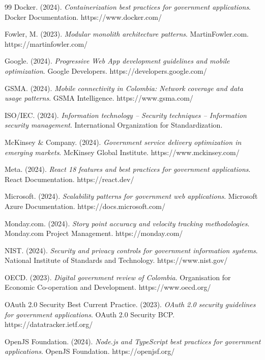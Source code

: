 \documentclass[12pt,a4paper]{article}
\begin{document}
\begin{thebibliography}{99}
 Docker. (2024). \emph{Containerization best practices for government applications}. Docker Documentation. https://www.docker.com/

 Fowler, M. (2023). \emph{Modular monolith architecture patterns}. MartinFowler.com. https://martinfowler.com/

 Google. (2024). \emph{Progressive Web App development guidelines and mobile optimization}. Google Developers. https://developers.google.com/

 GSMA. (2024). \emph{Mobile connectivity in Colombia: Network coverage and data usage patterns}. GSMA Intelligence. https://www.gsma.com/

 ISO/IEC. (2024). \emph{Information technology -- Security techniques -- Information security management}. International Organization for Standardization.

 McKinsey \& Company. (2024). \emph{Government service delivery optimization in emerging markets}. McKinsey Global Institute. https://www.mckinsey.com/

 Meta. (2024). \emph{React 18 features and best practices for government applications}. React Documentation. https://react.dev/

 Microsoft. (2024). \emph{Scalability patterns for government web applications}. Microsoft Azure Documentation. https://docs.microsoft.com/

 Monday.com. (2024). \emph{Story point accuracy and velocity tracking methodologies}. Monday.com Project Management. https://monday.com/

 NIST. (2024). \emph{Security and privacy controls for government information systems}. National Institute of Standards and Technology. https://www.nist.gov/

 OECD. (2023). \emph{Digital government review of Colombia}. Organisation for Economic Co-operation and Development. https://www.oecd.org/

 OAuth 2.0 Security Best Current Practice. (2023). \emph{OAuth 2.0 security guidelines for government applications}. OAuth 2.0 Security BCP. https://datatracker.ietf.org/

 OpenJS Foundation. (2024). \emph{Node.js and TypeScript best practices for government applications}. OpenJS Foundation. https://openjsf.org/


\end{thebibliography}
\end{document}
